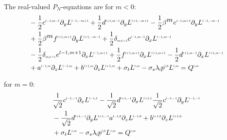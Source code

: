 The real-valued $P_N$-equations are for $m<0$:
\begin{align}
&-\frac{1}{2}c^{\scaleto{l-1,m-1}{4pt}}
\partial_y
L^{\scaleto{l-1,-m+1}{4pt}}
+\frac{1}{2}d^{\scaleto{l+1,m-1}{4pt}}
\partial_y
L^{\scaleto{l+1,-m+1}{4pt}}
-\frac{1}{2}\beta^{\scaleto{m}{4pt}}e^{\scaleto{l-1,m+1}{4pt}}
\partial_y
L^{\scaleto{l-1,-m-1}{4pt}}
\nonumber
\\&
+\frac{1}{2}\beta^{\scaleto{m}{4pt}}f^{\scaleto{l+1,m+1}{4pt}}
\partial_y
L^{\scaleto{l+1,-m-1}{4pt}}
+\frac{1}{2}\delta_{\scaleto{m\neq -1}{4pt}}c^{\scaleto{l-1,m-1}{4pt}}
\partial_x
L^{\scaleto{l-1,m-1}{4pt}}
\nonumber
\\&
-\frac{1}{2}\delta_{\scaleto{m\neq -1}{4pt}}e^{{l-1,m+1}}
\partial_x
L^{\scaleto{l-1,m+1}{4pt}}
+\frac{1}{2}f^{\scaleto{l+1,m+1}{4pt}}
\partial_x
L^{\scaleto{l+1,m+1}{4pt}}
-\frac{1}{2}d^{\scaleto{l+1,m-1}{4pt}}
\partial_x
L^{\scaleto{l+1,m-1}{4pt}}
\nonumber
\\&
+a^{\scaleto{l-1,m}{4pt}}
\partial_z
L^{\scaleto{l-1,m}{4pt}}
+b^{\scaleto{l+1,m}{4pt}}
\partial_z
L^{\scaleto{l+1,m}{4pt}}
+\sigma_t L^{\scaleto{l,m}{4pt}}
-\sigma_s\lambda_{\scaleto{l}{4pt}}p^{\scaleto{l,0}{4pt}}L^{\scaleto{l,m}{4pt}}
= Q^{\scaleto{l,m}{4pt}}
\label{eq:rpn_m_<_z}
\end{align}

for $m=0$:
\begin{align}
&
\frac{1}{\sqrt{2}}c^{\scaleto{l-1,-1}{4pt}}\partial_x L^{\scaleto{l-1,1}{4pt}}
-\frac{1}{\sqrt{2}}d^{\scaleto{l+1,-1}{4pt}}\partial_x L^{\scaleto{l+1,1}{4pt}}
\frac{1}{\sqrt{2}}c^{\scaleto{l-1,-1}{4pt}}\partial_y L^{\scaleto{l-1,-1}{4pt}}
\nonumber
\\&
-\frac{1}{\sqrt{2}}d^{\scaleto{l+1,-1}{4pt}}\partial_y L^{\scaleto{l+1,-1}{4pt}}
a^{\scaleto{l-1,0}{4pt}}\partial_z L^{\scaleto{l-1,0}{4pt}}
+b^{\scaleto{l+1,0}{4pt}}\partial_z L^{\scaleto{l+1,0}{4pt}}
\nonumber
\\&
+\sigma_t L^{\scaleto{l,m}{4pt}}
-\sigma_s\lambda_{\scaleto{l}{4pt}}p^{\scaleto{l,0}{4pt}}L^{\scaleto{l,m}{4pt}}
= Q^{\scaleto{l,m}{4pt}}
\label{eq:rpn_m_=_z}
\end{align}

